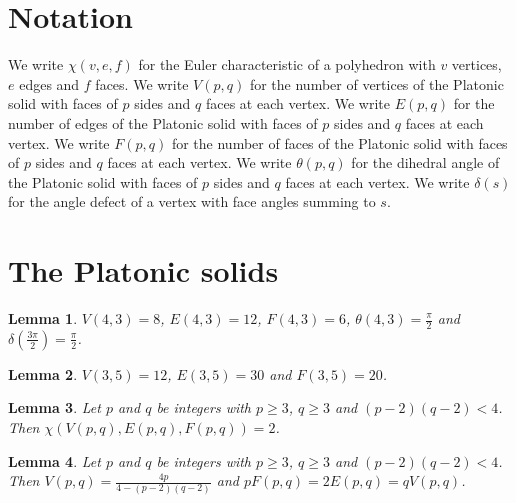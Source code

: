 \documentclass{article}
\newtheorem{lemma}{Lemma}
\begin{document}
\section{Notation}

We write $\chi(v,e,f)$ for the Euler characteristic of a polyhedron with $v$ vertices, $e$ edges and $f$ faces.
We write $V(p,q)$ for the number of vertices of the Platonic solid with faces of $p$ sides and $q$ faces at each vertex.
We write $E(p,q)$ for the number of edges of the Platonic solid with faces of $p$ sides and $q$ faces at each vertex.
We write $F(p,q)$ for the number of faces of the Platonic solid with faces of $p$ sides and $q$ faces at each vertex.
We write $\theta(p,q)$ for the dihedral angle of the Platonic solid with faces of $p$ sides and $q$ faces at each vertex.
We write $\delta(s)$ for the angle defect of a vertex with face angles summing to $s$.

\section{The Platonic solids}

\begin{lemma}\label{cube}
$V(4,3)=8$, $E(4,3)=12$, $F(4,3)=6$, $\theta(4,3)=\frac{\pi}{2}$ and $\delta(\frac{3\pi}{2})=\frac{\pi}{2}$.
\end{lemma}

\begin{lemma}\label{icosahedron}
$V(3,5)=12$, $E(3,5)=30$ and $F(3,5)=20$.
\end{lemma}

\begin{lemma}\label{euler}
Let $p$ and $q$ be integers with $p\ge3$, $q\ge3$ and $(p-2)(q-2)<4$. Then $\chi(V(p,q),E(p,q),F(p,q))=2$.
\end{lemma}

\begin{lemma}\label{counts}
Let $p$ and $q$ be integers with $p\ge3$, $q\ge3$ and $(p-2)(q-2)<4$. Then $V(p,q)=\frac{4p}{4-(p-2)(q-2)}$ and $pF(p,q)=2E(p,q)=qV(p,q)$.
\end{lemma}
\end{document}
